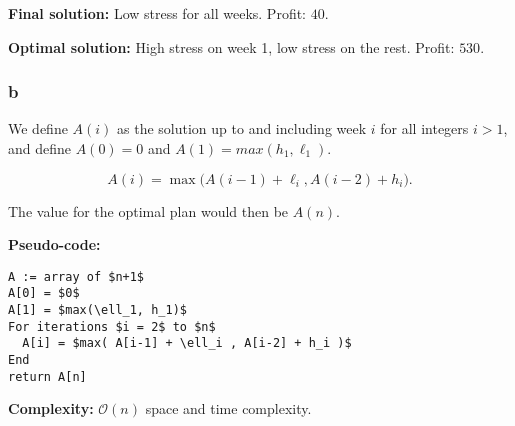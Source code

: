 \documentclass[12pt, letterpaper]{article}
\begin{document}
\noindent\textbf{Final solution:} Low stress for all weeks. Profit: $40$.

\noindent\textbf{Optimal solution:} High stress on week 1, low stress on the rest. Profit: $530$.

\subsubsection*{b}

We define $A(i)$ as the solution up to and including week $i$ for all integers $i > 1$, and define $A(0) = 0$ and $A(1) = max(h_1, \ell_1)$.

\begin{equation*}
    A(i) = \max \big(  A(i-1)+\ell_i, A(i-2)+h_i  \big).
\end{equation*}

\noindent The value for the optimal plan would then be $A(n)$.
\clearpage

\noindent \textbf{Pseudo-code:}

\begin{lstlisting}
A := array of $n+1$
A[0] = $0$
A[1] = $max(\ell_1, h_1)$
For iterations $i = 2$ to $n$
  A[i] = $max( A[i-1] + \ell_i , A[i-2] + h_i )$
End
return A[n]
\end{lstlisting}

\noindent \textbf{Complexity:} $\mathcal{O}(n)$ space and time complexity.
\end{document}
